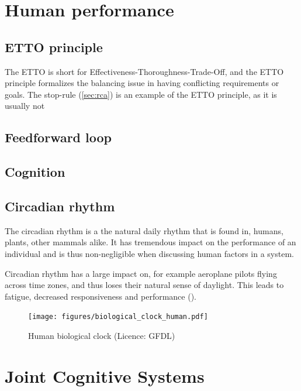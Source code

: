 \section{Human performance}

\subsection{ETTO principle}
The ETTO is short for Effectiveness-Thoroughness-Trade-Off, and the ETTO principle formalizes the balancing issue in having conflicting requirements or goals. The stop-rule (\ref{sec:rca}) is an example of the ETTO principle, as it is usually not 

\subsection{Feedforward loop}
\subsection{Cognition}

\subsection{Circadian rhythm}
The circadian rhythm is a the natural daily rhythm that is found in, humans, plants, other mammals alike. It has tremendous impact on the performance of an individual and is thus non-negligible when discussing human factors in a system.

Circadian rhythm has a large impact on, for example aeroplane pilots flying across time zones, and thus loses their natural sense of daylight. This leads to fatigue, decreased responsiveness and performance (\cite{mallis2010aircrew}).
\begin{figure}[h]
 \centering
   \texttt{[image: figures/biological\_clock\_human.pdf]}
 \caption{Human biological clock (Licence: GFDL)}
 \label{fig:human_biological_clock}
\end{figure}

\section{Joint Cognitive Systems}

